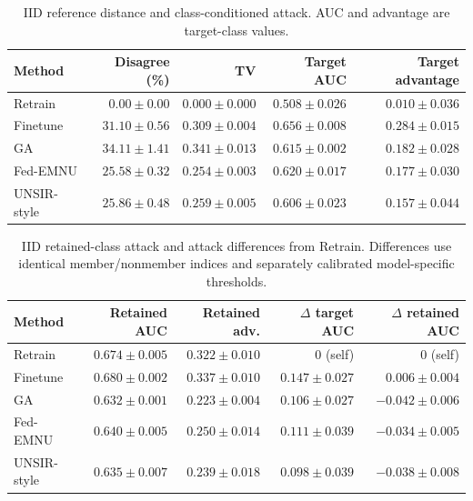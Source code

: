 \begin{table}[H]\centering\small
\caption{IID reference distance and class-conditioned attack. AUC and advantage are target-class values.}
\label{tab:iid-distance}
\begin{tabular}{lrrrr}\toprule Method & Disagree (\%) & TV & Target AUC & Target advantage\\\midrule
Retrain & $0.00 \pm 0.00$ & $0.000 \pm 0.000$ & $0.508 \pm 0.026$ & $0.010 \pm 0.036$\\
Finetune & $31.10 \pm 0.56$ & $0.309 \pm 0.004$ & $0.656 \pm 0.008$ & $0.284 \pm 0.015$\\
GA & $34.11 \pm 1.41$ & $0.341 \pm 0.013$ & $0.615 \pm 0.002$ & $0.182 \pm 0.028$\\
Fed-EMNU & $25.58 \pm 0.32$ & $0.254 \pm 0.003$ & $0.620 \pm 0.017$ & $0.177 \pm 0.030$\\
UNSIR-style & $25.86 \pm 0.48$ & $0.259 \pm 0.005$ & $0.606 \pm 0.023$ & $0.157 \pm 0.044$\\
\bottomrule\end{tabular}\end{table}

\begin{table}[H]\centering\small
\caption{IID retained-class attack and attack differences from Retrain. Differences use identical member/nonmember indices and separately calibrated model-specific thresholds.}
\label{tab:iid-attack}
\begin{tabular}{lrrrr}\toprule Method & Retained AUC & Retained adv. & $\Delta$ target AUC & $\Delta$ retained AUC\\\midrule
Retrain & $0.674 \pm 0.005$ & $0.322 \pm 0.010$ & 0 (self) & 0 (self)\\
Finetune & $0.680 \pm 0.002$ & $0.337 \pm 0.010$ & $0.147 \pm 0.027$ & $0.006 \pm 0.004$\\
GA & $0.632 \pm 0.001$ & $0.223 \pm 0.004$ & $0.106 \pm 0.027$ & $-0.042 \pm 0.006$\\
Fed-EMNU & $0.640 \pm 0.005$ & $0.250 \pm 0.014$ & $0.111 \pm 0.039$ & $-0.034 \pm 0.005$\\
UNSIR-style & $0.635 \pm 0.007$ & $0.239 \pm 0.018$ & $0.098 \pm 0.039$ & $-0.038 \pm 0.008$\\
\bottomrule\end{tabular}\end{table}

